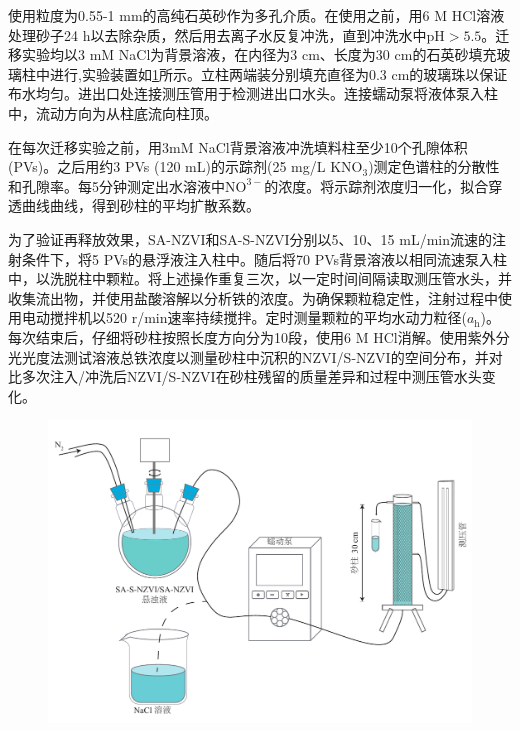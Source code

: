 

使用粒度为0.55-1 mm的高纯石英砂作为多孔介质。在使用之前，用6 M HCl溶液处理砂子24 h以去除杂质，然后用去离子水反复冲洗，直到冲洗水中$\mathrm{pH}>5.5$。迁移实验均以3 mM NaCl为背景溶液，在内径为3 cm、长度为30 cm的石英砂填充玻璃柱中进行,实验装置如\cref{column}所示。立柱两端装分别填充直径为0.3 cm的玻璃珠以保证布水均匀。进出口处连接测压管用于检测进出口水头。连接蠕动泵将液体泵入柱中，流动方向为从柱底流向柱顶。

在每次迁移实验之前，用3mM NaCl背景溶液冲洗填料柱至少10个孔隙体积(PVs)。之后用约3 PVs (120 mL)的示踪剂(25 mg/L $\mathrm{KNO_3}$)测定色谱柱的分散性和孔隙率。每5分钟测定出水溶液中$\mathrm{NO^{3-}}$的浓度。将示踪剂浓度归一化，拟合穿透曲线曲线，得到砂柱的平均扩散系数。

为了验证再释放效果，SA-NZVI和SA-S-NZVI分别以5、10、15 mL/min流速的注射条件下，将5 PVs的悬浮液注入柱中。随后将70 PVs背景溶液以相同流速泵入柱中，以洗脱柱中颗粒。将上述操作重复三次，以一定时间间隔读取测压管水头，并收集流出物，并使用盐酸溶解以分析铁的浓度。为确保颗粒稳定性，注射过程中使用电动搅拌机以520 r/min速率持续搅拌。定时测量颗粒的平均水动力粒径($a_\mathrm{h}$)。每次结束后，仔细将砂柱按照长度方向分为10段，使用6 M HCl消解。使用紫外分光光度法测试溶液总铁浓度以测量砂柱中沉积的NZVI/S-NZVI的空间分布，并对比多次注入/冲洗后NZVI/S-NZVI在砂柱残留的质量差异和过程中测压管水头变化。

\begin{figure}[h]
    \centering
    \includegraphics[width=12cm]{figs/column.pdf}
    \label{column}
\end{figure}

